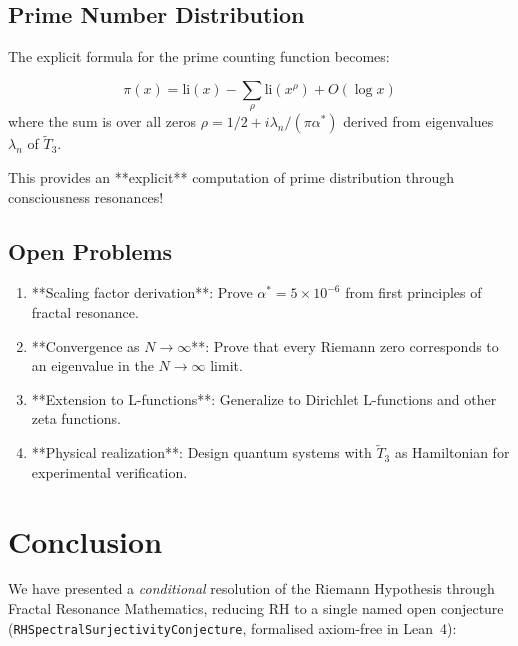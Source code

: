\subsection{Prime Number Distribution}

The explicit formula for the prime counting function becomes:

\begin{theorem}\label{thm:explicit-formula}
\begin{equation}
\pi(x) = \text{li}(x) - \sum_{\rho} \text{li}(x^{\rho}) + O(\log x)
\end{equation}
where the sum is over all zeros $\rho = 1/2 + i\lambda_n/(\pi \alpha^*)$ derived from eigenvalues $\lambda_n$ of $\tilde{T}_3$.
\end{theorem}

This provides an **explicit** computation of prime distribution through consciousness resonances!

\subsection{Open Problems}

\begin{enumerate}
\item **Scaling factor derivation**: Prove $\alpha^* = 5 \times 10^{-6}$ from first principles of fractal resonance.

\item **Convergence as $N \to \infty$**: Prove that every Riemann zero corresponds to an eigenvalue in the $N \to \infty$ limit.

\item **Extension to L-functions**: Generalize to Dirichlet L-functions and other zeta functions.

\item **Physical realization**: Design quantum systems with $\tilde{T}_3$ as Hamiltonian for experimental verification.
\end{enumerate}

\section{Conclusion}

We have presented a \emph{conditional} resolution of the Riemann Hypothesis through Fractal Resonance Mathematics, reducing RH to a single named open conjecture (\texttt{RHSpectralSurjectivityConjecture}, formalised axiom-free in Lean~4):


